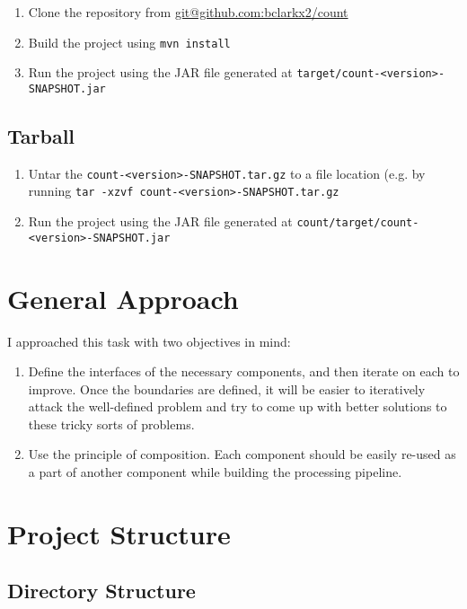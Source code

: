 \documentclass{article}
\begin{document}
\begin{enumerate}
 \item Clone the repository from \url{git@github.com:bclarkx2/count}
 \item Build the project using \texttt{mvn install}
 \item Run the project using the JAR file generated at \texttt{target/count-<version>-SNAPSHOT.jar}
\end{enumerate}

\subsection{Tarball}

\begin{enumerate}
 \item Untar the \texttt{count-<version>-SNAPSHOT.tar.gz} to a file location (e.g. by running \texttt{tar -xzvf count-<version>-SNAPSHOT.tar.gz}
 \item Run the project using the JAR file generated at \texttt{count/target/count-<version>-SNAPSHOT.jar}
\end{enumerate}


\section{General Approach}
I approached this task with two objectives in mind:

\begin{enumerate}
 \item Define the interfaces of the necessary components, and then iterate on each to improve. Once the boundaries are defined, it will be easier to iteratively attack the well-defined problem and try to come up with better solutions to these tricky sorts of problems.
 \item Use the principle of composition. Each component should be easily re-used as a part of another component while building the processing pipeline.
\end{enumerate}

\section{Project Structure}

\subsection{Directory Structure}
\end{document}
